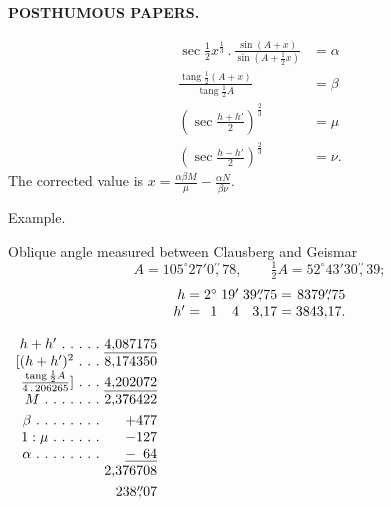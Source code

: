 \par\clearpage
\noindent{}\hfill{\small\textbf{POSTHUMOUS PAPERS.}}\hfill\null\par\medskip
\[
\begin{aligned}
\sec\tfrac12x^{\frac13}\,.\,\frac{\sin(A+x)}{\sin(A+\frac12x)}&=\alpha\\[4pt]
\frac{\operatorname{tang}\frac12(A+x)}{\operatorname{tang}\frac12A}&=\beta\\[4pt]
\left(\sec\frac{h+h'}2\right)^{\frac23}&=\mu\\[4pt]
\left(\sec\frac{h-h'}2\right)^{\frac23}&=\nu.
\end{aligned}
\]
\noindent The corrected value is $\displaystyle x=\frac{\alpha\beta M}{\mu}-\frac{\alpha N}{\beta\nu}$.
\begin{center}Example.\end{center}
\noindent Oblique angle measured between Clausberg and Geismar
\[
A=105^\circ27'0\overset{\prime\prime}{,}78,\qquad
\tfrac12A=52^\circ43'30\overset{\prime\prime}{,}39;
\]
\[
\begin{array}{r@{\;}c@{\;}r@{\;}r@{\;}r@{\;}c@{\;}r}
h&=&2^\circ&19'&39\overset{\prime\prime}{,}75&=&8379\overset{\prime\prime}{,}75\\
h'&=&1&4&3{,}17&=&3843{,}17.
\end{array}
\]
\noindent\begin{minipage}[t]{.31\linewidth}\centering
$\begin{array}{r@{\ }r}
h+h'\ .\ .\ .\ .\ .&\underline{4{,}087175}\\
{[}(h+h')^2\ .\ .\ .&8{,}174350\\
\frac{\operatorname{tang}\frac12A}{4\,.\,206265}]\ .\ .\ .&\underline{4{,}202072}\\
M\ .\ .\ .\ .\ .\ .\ .&2{,}376422\\[3pt]
\beta\ .\ .\ .\ .\ .\ .\ .\ .&+477\\
1:\mu\ .\ .\ .\ .\ .\ .&-127\\
\alpha\ .\ .\ .\ .\ .\ .\ .\ .&\underline{-\phantom{1}64}\\
&2{,}376708\\[3pt]
&238\overset{\prime\prime}{,}07
\end{array}$
\end{minipage}\hfill
